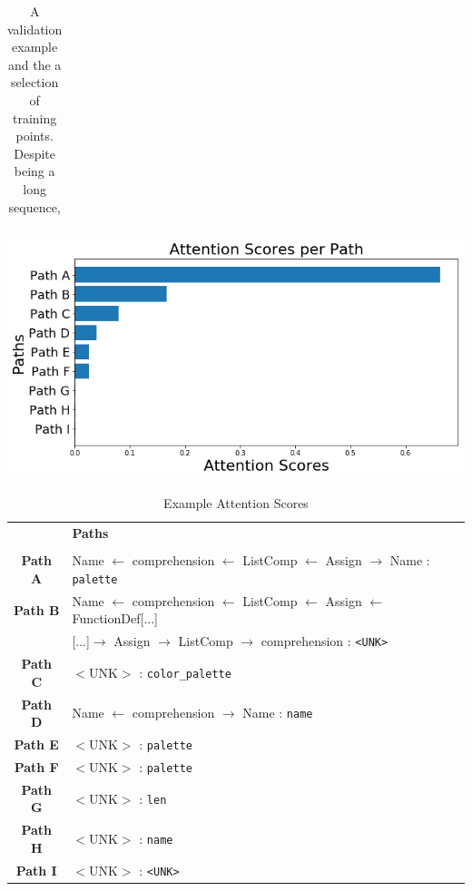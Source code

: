 \begin{table}
\begin{center}
\begin{tabular}{l}
\end{tabular}

\caption{A validation example and the a selection of training points. Despite being a long sequence, }
\end{center}
\end{table}



\begingroup
\begin{table}
\begin{center}
\includegraphics[width=0.8\linewidth]{ImagesCodeRelated/attention_xkcd.png}
    \fontsize{10pt}{12pt}\selectfont
\begin{tabular}{c l}
    & \textbf{Paths} \\
    \\
    \textbf{Path A} & Name $\leftarrow$ comprehension $\leftarrow$ ListComp $\leftarrow$ Assign $\rightarrow$ Name : \texttt{palette} \\
    \textbf{Path B} & Name $\leftarrow$ comprehension $\leftarrow$ ListComp $\leftarrow$ Assign $\leftarrow$ FunctionDef[...] \\
        & [...]$\rightarrow$ Assign $\rightarrow$ ListComp $\rightarrow$ comprehension : \texttt{<UNK>} \\
    \textbf{Path C} & $<$UNK$>$ : \texttt{color_palette} \\
    \textbf{Path D} & Name $\leftarrow$ comprehension $\rightarrow$ Name : \texttt{name} \\
    \textbf{Path E} & $<$UNK$>$ : \texttt{palette} \\
    \textbf{Path F} & $<$UNK$>$ : \texttt{palette} \\
    \textbf{Path G} & $<$UNK$>$ : \texttt{len} \\
    \textbf{Path H} & $<$UNK$>$ : \texttt{name} \\
    \textbf{Path I} & $<$UNK$>$ : \texttt{<UNK>} \\
\end{tabular}
\end{center}

\caption{Example Attention Scores}
\end{table}
\endgroup

